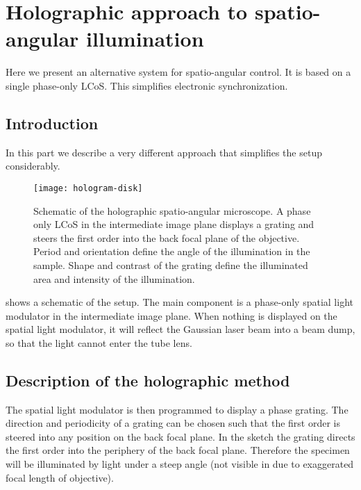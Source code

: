 \chapter{Holographic approach to spatio-angular illumination}
\begin{summary}
  Here we present an alternative system for spatio-angular control. It
  is based on a single phase-only LCoS. This simplifies electronic
  synchronization.
\end{summary}

\section{Introduction}
In this part we describe a very different approach that simplifies the
setup considerably.

\begin{figure}[!hbt]
  \centering
  
  \texttt{[image: hologram-disk]}
  \caption{Schematic of the holographic spatio-angular microscope. A
    phase only LCoS in the intermediate image plane displays a grating
    and steers the first order into the back focal plane of the
    objective. Period and orientation define the angle of the
    illumination in the sample. Shape and contrast of the grating
    define the illuminated area and intensity of the illumination.}
  \label{fig:holo-setup3}
\end{figure}

 shows a schematic of the setup. The main
component is a phase-only spatial light modulator in the intermediate
image plane. When nothing is displayed on the spatial light modulator,
it will reflect the Gaussian laser beam into a beam dump, so that
the light cannot enter the tube lens.

\section{Description of the holographic method}
The spatial light modulator is then programmed to display a phase
grating.  The direction and periodicity of a grating can be chosen
such that the first order is steered into any position on the back
focal plane. In the sketch the grating directs the first order into
the periphery of the back focal plane. Therefore the specimen will be
illuminated by light under a steep angle (not visible in
 due to exaggerated focal length of
objective).

